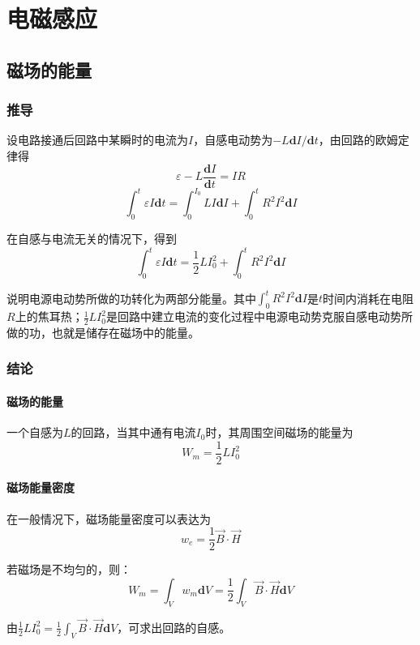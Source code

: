 \chapter{电磁感应}
\section{磁场的能量}
\subsection{推导}
设电路接通后回路中某瞬时的电流为$I$，自感电动势为$-L\mathbf{d}I/\mathbf{d}t$，由回路的欧姆定律得
$$\varepsilon-L\frac{\mathbf{d}I}{\mathbf{d}t}=IR$$
$$\int_{0}^{t}\varepsilon I\mathbf{d}t=\int_{0}^{I_0}LI\mathbf{d}I+\int_{0}^{t}R^2I^2\mathbf{d}I$$

在自感与电流无关的情况下，得到
$$\int_{0}^{t}\varepsilon I\mathbf{d}t=\frac{1}{2}LI_0^2+\int_{0}^{t}R^2I^2\mathbf{d}I$$

说明电源电动势所做的功转化为两部分能量。其中$\int_{0}^{t}R^2I^2\mathbf{d}I$是$t$时间内消耗在电阻$R$上的焦耳热；$\frac{1}{2}LI_0^2$是回路中建立电流的变化过程中电源电动势克服自感电动势所做的功，也就是储存在磁场中的能量。
\subsection{结论}
\subsubsection{磁场的能量}
一个自感为$L$的回路，当其中通有电流$I_0$时，其周围空间磁场的能量为
$$W_m=\frac{1}{2}LI_0^2$$

\subsubsection{磁场能量密度}
在一般情况下，磁场能量密度可以表达为
$$w_e=\frac{1}{2}\vec{B}\cdot\vec{H}$$

若磁场是不均匀的，则：
$$W_m=\int_{V}w_m\mathbf{d}V=\frac{1}{2}\int_{V}\vec{B}\cdot\vec{H}\mathbf{d}V$$

由$\frac{1}{2}LI_0^2=\frac{1}{2}\int_{V}\vec{B}\cdot\vec{H}\mathbf{d}V$，可求出回路的自感。